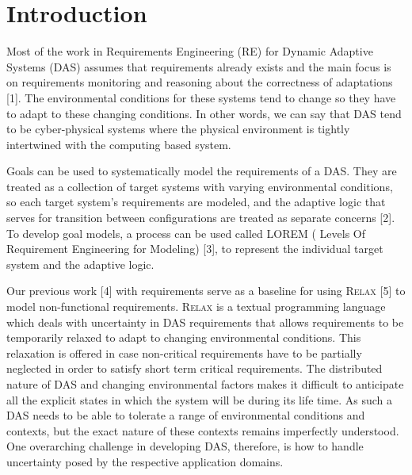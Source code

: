 \documentclass[10pt, conference, compsocconf]{IEEEtran}
\def\myrelax{\textsc{Relax}}                  %
\begin{document}
%
\IEEEpeerreviewmaketitle


\section{Introduction}

Most of the work in Requirements Engineering (RE) for Dynamic Adaptive Systems (DAS) assumes that requirements already exists and the main focus is on requirements monitoring and reasoning about the correctness of adaptations [1]. The environmental conditions for these systems tend to change so they have to adapt to these changing conditions.  In other words, we can say that DAS tend to be cyber-physical systems where the physical environment is tightly intertwined with the computing based system. 

Goals can be used to systematically model the requirements of a DAS. They are treated as a collection of target systems with varying environmental conditions, so each target system's requirements are modeled, and the adaptive logic that serves for transition between configurations are treated as separate concerns [2]. To develop goal models, a process can be used called LOREM ( Levels Of Requirement Engineering for Modeling) [3], to represent the individual target system and the adaptive logic. 

Our previous work [4] with requirements serve as a baseline for using \myrelax{} [5] to model non-functional requirements. \myrelax{} is a textual programming language which deals with uncertainty in DAS requirements that allows requirements to be temporarily relaxed to adapt to changing environmental conditions. This relaxation is offered in case non-critical requirements have to be partially neglected in order to satisfy short term critical requirements. The distributed nature of DAS and changing environmental factors makes it difficult to anticipate all the explicit states in which the system will be during its life time. As such a DAS needs to be able to tolerate a range of environmental conditions and contexts, but the exact nature of these contexts remains imperfectly understood. One overarching challenge in developing DAS, therefore, is how to handle uncertainty posed by the respective application domains. 
\end{document}
